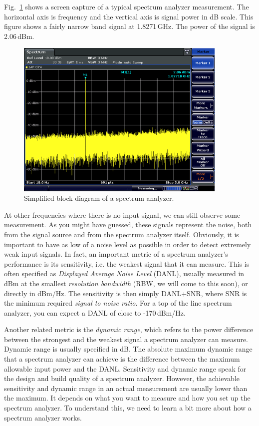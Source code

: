 \documentclass[letterpaper, 11pt]{article}
\begin{document}
Fig.~\ref{fig:sa-screen} shows a screen capture of a typical spectrum analyzer measurement. The horizontal axis is frequency and the vertical axis is signal power in dB scale. This figure shows a fairly narrow band signal at 1.8271\,GHz. The power of the signal is 2.06\,dBm.

\begin{figure}[h]
	\centering
	\includegraphics[width=4in]{sa-screen}
	\caption{Simplified block diagram of a spectrum analyzer.}
	\label{fig:sa-screen}
\end{figure}

At other frequencies where there is no input signal, we can still observe some measurement. As you might have guessed, these signals represent the noise, both from the signal source and from the spectrum analyzer itself. Obviously, it is important to have as low of a noise level as possible in order to detect extremely weak input signals. In fact, an important metric of a spectrum analyzer's performance is its sensitivity, i.e. the weakest signal that it can measure. This is often specified as \textit{Displayed Average Noise Level} (DANL), usually measured in dBm at the smallest \textit{resolution bandwidth} (RBW, we will come to this soon), or directly in dBm/Hz. The sensitivity is then simply DANL+SNR, where SNR is the minimum required \textit{signal to noise ratio}. For a top of the line spectrum analyzer, you can expect a DANL of close to -170\,dBm/Hz.

Another related metric is the \textit{dynamic range}, which refers to the power difference between the strongest and the weakest signal a spectrum analyzer can measure. Dynamic range is usually specified in dB. The absolute maximum dynamic range that a spectrum analyzer can achieve is the difference between the maximum allowable input power and the DANL. 
Sensitivity and dynamic range speak for the design and build quality of a spectrum analyzer. However, the achievable sensitivity and dynamic range in an actual measurement are usually lower than the maximum. It depends on what you want to measure and how you set up the spectrum analyzer. To understand this, we need to learn a bit more about how a spectrum analyzer works. 
\end{document}
